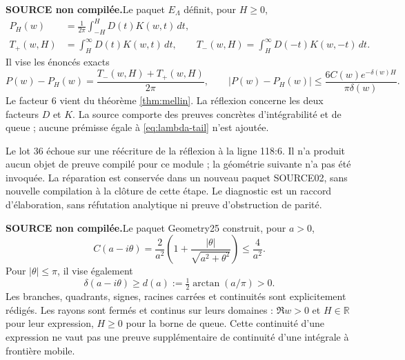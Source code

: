 \documentclass[11pt,a4paper]{article}
\theoremstyle{remark}
\newcommand{\Lam}{\Lambda}
\newcommand{\R}{\mathbb R}
\newcommand{\source}{\textbf{SOURCE non compilée.}\space}
\begin{document}
\source Le paquet $E_\Lam$ définit, pour $H\ge0$,
\begin{align}
P_H(w)&=\frac1{2\pi}\int_{-H}^{H}D(t)K(w,t)\,dt,\\
T_+(w,H)&=\int_H^\infty D(t)K(w,t)\,dt,\qquad
T_-(w,H)=\int_H^\infty D(-t)K(w,-t)\,dt.
\end{align}
Il vise les énoncés exacts
\begin{equation}\label{eq:lambda-tail}
P(w)-P_H(w)=\frac{T_-(w,H)+T_+(w,H)}{2\pi},\qquad
|P(w)-P_H(w)|\le
\frac{6C(w)e^{-\delta(w)H}}{\pi\delta(w)}.
\end{equation}
Le facteur 6 vient du théorème \ref{thm:mellin}. La réflexion concerne les
deux facteurs $D$ et $K$. La source comporte des preuves concrètes
d'intégrabilité et de queue ; aucune prémisse égale à
\eqref{eq:lambda-tail} n'est ajoutée.

Le lot 36 échoue sur une réécriture de la réflexion à la ligne 118:6.
Il n'a produit aucun objet de preuve compilé pour ce module ; la géométrie
suivante n'a pas été invoquée. La réparation est conservée dans un nouveau
paquet SOURCE02, sans nouvelle compilation à la clôture de cette étape.
Le diagnostic est un raccord d'élaboration, sans réfutation analytique
ni preuve d'obstruction de parité.

\source Le paquet Geometry25 construit, pour $a>0$,
\begin{equation}\label{eq:geometry}
C(a-i\theta)=\frac2{a^2}
\left(1+\frac{|\theta|}{\sqrt{a^2+\theta^2}}\right)\le\frac4{a^2}.
\end{equation}
Pour $|\theta|\le\pi$, il vise également
\begin{equation}\label{eq:d}
\delta(a-i\theta)\ge d(a):=\tfrac12\arctan(a/\pi)>0.
\end{equation}
Les branches, quadrants, signes, racines carrées et continuités sont
explicitement rédigés. Les rayons sont fermés et continus sur leurs
domaines : $\Re w>0$ et $H\in\R$ pour leur expression, $H\ge0$ pour la
borne de queue. Cette continuité d'une expression ne vaut pas une preuve
supplémentaire de continuité d'une intégrale à frontière mobile.

\clearpage
\end{document}
